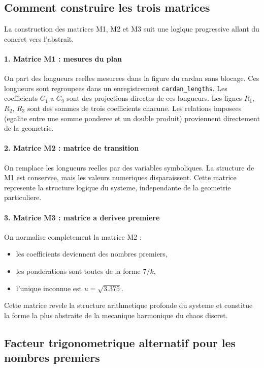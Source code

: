 \documentclass[12pt,a4paper]{article}
\theoremstyle{definition}
\theoremstyle{remark}
\begin{document}
\subsection{Comment construire les trois matrices}

La construction des matrices M1, M2 et M3 suit une logique progressive allant
du concret vers l'abstrait.

\paragraph{1. Matrice M1 : mesures du plan}
On part des longueurs reelles mesurees dans la figure du cardan sans blocage.
Ces longueurs sont regroupees dans un enregistrement \texttt{cardan\_lengths}.
Les coefficients \(C_1\) a \(C_9\) sont des projections directes de ces longueurs.
Les lignes \(R_1\), \(R_2\), \(R_3\) sont des sommes de trois coefficients chacune.
Les relations imposees (egalite entre une somme ponderee et un double produit)
proviennent directement de la geometrie.

\paragraph{2. Matrice M2 : matrice de transition}
On remplace les longueurs reelles par des variables symboliques.
La structure de M1 est conservee, mais les valeurs numeriques disparaissent.
Cette matrice represente la structure logique du systeme, independante de la
geometrie particuliere.

\paragraph{3. Matrice M3 : matrice a derivee premiere}
On normalise completement la matrice M2 :
\begin{itemize}
  \item les coefficients deviennent des nombres premiers,
  \item les ponderations sont toutes de la forme \(7/k\),
  \item l'unique inconnue est \(u = \sqrt{3.375}\).
\end{itemize}
Cette matrice revele la structure arithmetique profonde du systeme et constitue
la forme la plus abstraite de la mecanique harmonique du chaos discret.

\subsection{Facteur trigonometrique alternatif pour les nombres premiers}
\end{document}
